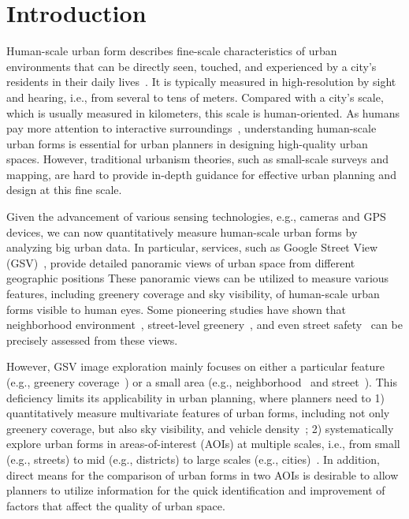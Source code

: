 \section{Introduction}
Human-scale urban form describes fine-scale characteristics of urban environments that can be directly seen, touched, and experienced by a city's residents in their daily lives~\cite{long_2016_human-scale}.
It is typically measured in high-resolution by sight and hearing, i.e., from several to tens of meters.
Compared with a city's scale, which is usually measured in kilometers, this scale is human-oriented.
As humans pay more attention to interactive surroundings~\cite{gehl_1971_life}, understanding human-scale urban forms is essential for urban planners in designing high-quality urban spaces. 
However, traditional urbanism theories, such as small-scale surveys and mapping, are hard to provide in-depth guidance for effective urban planning and design at this fine scale.

Given the advancement of various sensing technologies, e.g., cameras and GPS devices, we can now quantitatively measure human-scale urban forms by analyzing big urban data.
In particular, services, such as Google Street View (GSV)~\cite{anguelov2010google}, provide detailed panoramic views of urban space from different geographic positions
These panoramic views can be utilized to measure various features, including greenery coverage and sky visibility, of human-scale urban forms visible to human eyes.
Some pioneering studies have shown that neighborhood environment~\cite{rundle_2011_using}, street-level greenery~\cite{li_2015_accessing}, and even street safety~\cite{naik2014streetscore} can be precisely assessed from these views.

However, GSV image exploration mainly focuses on either a particular feature (e.g., greenery coverage~\cite{li_2015_accessing}) or a small area (e.g., neighborhood~\cite{rundle_2011_using} and street~\cite{naik2014streetscore, li_2015_accessing}).
This deficiency limits its applicability in urban planning, where planners need to 
1) quantitatively measure multivariate features of urban forms, including not only greenery coverage, but also sky visibility, and vehicle density~\cite{long_2017_how}; 
2) systematically explore urban forms in areas-of-interest (AOIs) at multiple scales, i.e., from small (e.g., streets) to mid (e.g., districts) to large scales (e.g., cities)~\cite{liu_2015_understanding}.
In addition, direct means for the comparison of urban forms in two AOIs is desirable to allow planners to utilize information for the quick identification and improvement of factors that affect the quality of urban space.

